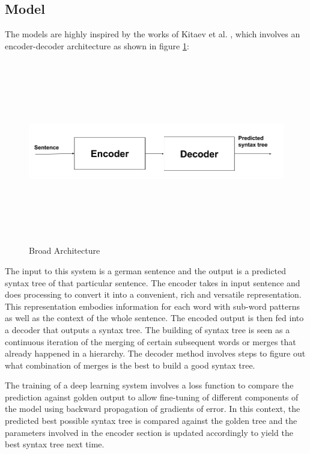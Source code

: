 \documentclass[a4paper, 11pt]{article}
\begin{document}
\subsection{Model}

The models are highly inspired by the works of Kitaev et al. \parencite*{Kitaev2019}, which involves an encoder-decoder architecture as shown in figure \ref{fig:broad_architecture}:

\begin{figure}[htpb]
    \centering
    \includegraphics[width=\textwidth,height=8cm,keepaspectratio=true]
    {encoder-decoder.png}
    \caption{
        Broad Architecture
    }
    \label{fig:broad_architecture}
\end{figure}

The input to this system is a german sentence and the output is a predicted syntax tree of that particular sentence. The encoder takes in input sentence and does processing to convert it into a convenient, rich and versatile representation. This representation embodies information for each word with sub-word patterns as well as the context of the whole sentence. The encoded output is then fed into a decoder that outputs a syntax tree. The building of syntax tree is seen as a continuous iteration of the merging of certain subsequent words or merges that already happened in a hierarchy. The decoder method involves steps to figure out what combination of merges is the best to build a good syntax tree.

The training of a deep learning system involves a loss function to compare the prediction against golden output to allow fine-tuning of different components of the model using backward propagation of gradients of error. In this context, the predicted best possible syntax tree is compared against the golden tree and the parameters involved in the encoder section is updated accordingly to yield the best syntax tree next time. 
\end{document}
